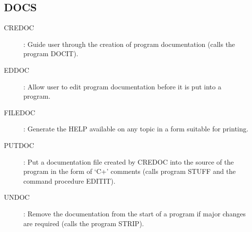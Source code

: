 \subsection {DOCS}
\begin{description}
\begin{description}
\item [CREDOC]: Guide user through the creation of program documentation
(calls the program DOCIT).
\item [EDDOC]: Allow user to edit program documentation before it is put into a
program.
\item [FILEDOC]: Generate the HELP available on any topic in a form
suitable for printing.
\item [PUTDOC]: Put a documentation file created by CREDOC into the source of
the program in the form of `C+' comments (calls program STUFF and the command
procedure EDITIT).
\item [UNDOC]: Remove the documentation from the start of a program if major
changes are required (calls the program STRIP).
\end{description}
\end{description}
